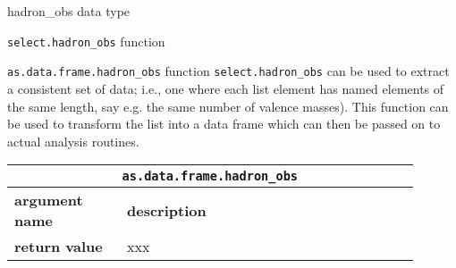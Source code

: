 \documentclass[10pt,a4paper]{article}
\begin{document}
\begin{section}{{\ttfamily hadron\_obs} data type}
\begin{subsection}{{\tt select.hadron\_obs} function}
\end{subsection}

\begin{subsection}{ {\tt as.data.frame.hadron\_obs} function }
{\tt select.hadron\_obs} can be used to extract a consistent set of data; i.e.,
one where each list element has named elements of the same length, say e.g. the
same number of valence masses). This function can be used to transform the list
into a data frame which can then be passed on to actual analysis routines.

{ \centering
\begin{tabular}{|p{0.25\linewidth}|p{0.65\linewidth}|}
\hline
\multicolumn{2}{|c|}{ {\tt as.data.frame.hadron\_obs} } \\
\hline \hline \textbf{argument name} & \textbf{description} \\ \hline
\hline 
\textbf{return value} & xxx \\
\hline
\end{tabular}
} %

\end{subsection}

\end{section} %
\end{document}
